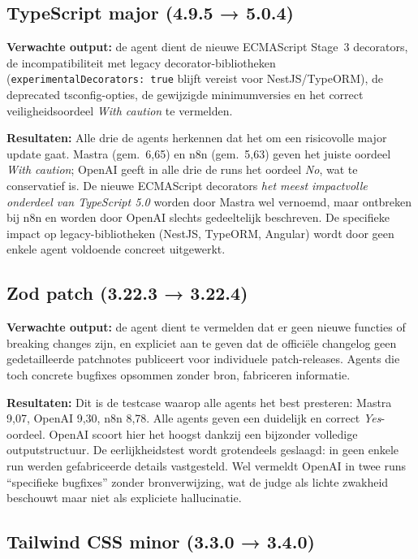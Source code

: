 \subsection{TypeScript major (4.9.5 → 5.0.4)}
\label{subsec:tc-typescript}
 
\textbf{Verwachte output:} de agent dient de nieuwe ECMAScript Stage~3 decorators, de incompatibiliteit met legacy decorator-bibliotheken (\texttt{experimentalDecorators: true} blijft vereist voor NestJS/TypeORM), de deprecated tsconfig-opties, de gewijzigde minimumversies en het correct veiligheidsoordeel \textit{With caution} te vermelden.
 
\textbf{Resultaten:} Alle drie de agents herkennen dat het om een risicovolle major update gaat. Mastra (gem.\ 6,65) en n8n (gem.\ 5,63) geven het juiste oordeel \textit{With caution}; OpenAI geeft in alle drie de runs het oordeel \textit{No}, wat te conservatief is. De nieuwe ECMAScript decorators \textit{het meest impactvolle onderdeel van TypeScript 5.0} worden door Mastra wel vernoemd, maar ontbreken bij n8n en worden door OpenAI slechts gedeeltelijk beschreven. De specifieke impact op legacy-bibliotheken (NestJS, TypeORM, Angular) wordt door geen enkele agent voldoende concreet uitgewerkt.

\subsection{Zod patch (3.22.3 → 3.22.4)}
\label{subsec:tc-zod}
 
\textbf{Verwachte output:} de agent dient te vermelden dat er geen nieuwe functies of breaking changes zijn, en expliciet aan te geven dat de officiële changelog geen gedetailleerde patchnotes publiceert voor individuele patch-releases. Agents die toch concrete bugfixes opsommen zonder bron, fabriceren informatie.
 
\textbf{Resultaten:} Dit is de testcase waarop alle agents het best presteren: Mastra 9,07, OpenAI 9,30, n8n 8,78. Alle agents geven een duidelijk en correct \textit{Yes}-oordeel. OpenAI scoort hier het hoogst dankzij een bijzonder volledige outputstructuur. De eerlijkheidstest wordt grotendeels geslaagd: in geen enkele run werden gefabriceerde details vastgesteld. Wel vermeldt OpenAI in twee runs ``specifieke bugfixes'' zonder bronverwijzing, wat de judge als lichte zwakheid beschouwt maar niet als expliciete hallucinatie.

\subsection{Tailwind CSS minor (3.3.0 → 3.4.0)}
\label{subsec:tc-tailwind}
 

